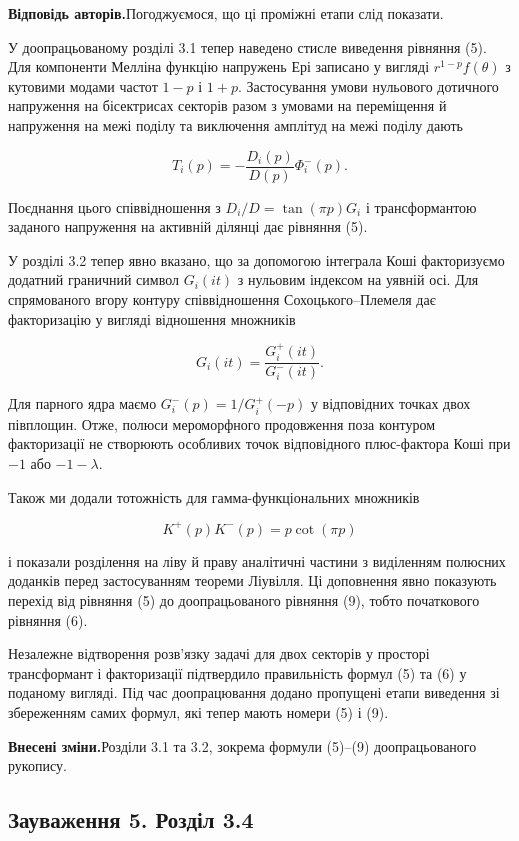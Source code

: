 \documentclass[11pt]{article}
\newcommand{\responseheading}{\textbf{Відповідь авторів.}\enspace}
\newcommand{\revisionheading}{\textbf{Внесені зміни.}\enspace}
\begin{document}
\responseheading Погоджуємося, що ці проміжні етапи слід показати.

У доопрацьованому розділі 3.1 тепер наведено стисле виведення рівняння (5). Для компоненти Мелліна функцію напружень Ері записано у вигляді \(r^{1-p}f(\theta)\) з кутовими модами частот \(1-p\) і \(1+p\). Застосування умови нульового дотичного напруження на бісектрисах секторів разом з умовами на переміщення й напруження на межі поділу та виключення амплітуд на межі поділу дають

\[
T_i(p)=-\frac{D_i(p)}{D(p)}\Phi_i^-(p).
\]

Поєднання цього співвідношення з \(D_i/D=\tan(\pi p)G_i\) і трансформантою заданого напруження на активній ділянці дає рівняння (5).

У розділі 3.2 тепер явно вказано, що за допомогою інтеграла Коші факторизуємо додатний граничний символ \(G_i(it)\) з нульовим індексом на уявній осі. Для спрямованого вгору контуру співвідношення Сохоцького--Племеля дає факторизацію у вигляді відношення множників

\[
G_i(it)=\frac{G_i^+(it)}{G_i^-(it)}.
\]

Для парного ядра маємо \(G_i^-(p)=1/G_i^+(-p)\) у відповідних точках двох півплощин. Отже, полюси мероморфного продовження поза контуром факторизації не створюють особливих точок відповідного плюс-фактора Коші при \(-1\) або \(-1-\lambda\).

Також ми додали тотожність для гамма-функціональних множників

\[
K^+(p)K^-(p)=p\cot(\pi p)
\]

і показали розділення на ліву й праву аналітичні частини з виділенням полюсних доданків перед застосуванням теореми Ліувілля. Ці доповнення явно показують перехід від рівняння (5) до доопрацьованого рівняння (9), тобто початкового рівняння (6).

Незалежне відтворення розв’язку задачі для двох секторів у просторі трансформант і факторизації підтвердило правильність формул (5) та (6) у поданому вигляді. Під час доопрацювання додано пропущені етапи виведення зі збереженням самих формул, які тепер мають номери (5) і (9).

\revisionheading Розділи 3.1 та 3.2, зокрема формули (5)–(9) доопрацьованого рукопису.

\subsection*{Зауваження 5. Розділ 3.4}
\end{document}

